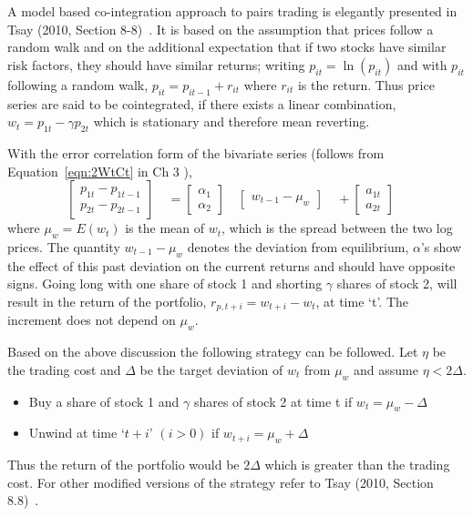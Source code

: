 A model based co-integration approach to pairs trading is elegantly presented in Tsay (2010, Section 8-8)~\cite{tsay}. It is based on the assumption that prices follow a random walk and on the additional expectation that if two stocks have similar risk factors, they should have similar returns; writing $p_{it} = \ln{(p_{it})}$ and with $p_{it}$ following a random walk, $p_{it} = p_{it-1} + r_{it}$ where $r_{it}$ is the return. Thus price series are said to be cointegrated, if there exists a linear combination, $w_t = p_{1t} - \gamma p_{2t}$ which is stationary and therefore mean reverting.


With the error correlation form of the bivariate series (follows from Equation~\ref{eqn:2WtCt} in Ch 3 ),
	\begin{equation}\label{eqn:errorbivar}
	\begin{bmatrix}
	p_{1t} - p_{1t-1} \\
	p_{2t} - p_{2t-1}
	\end{bmatrix}\quad
	= \begin{bmatrix} 
	\alpha_1\\ \alpha_2 
	\end{bmatrix}\quad 
	\begin{bmatrix} 
	w_{t-1} - \mu_{w}
	\end{bmatrix}\quad + 
	\begin{bmatrix} 
	a_{1t} \\ a_{2t} 
	\end{bmatrix}\quad
	\end{equation}
where $\mu_w = E(w_t)$ is the mean of $w_t$, which is the spread between the two log prices. The quantity $w_{t-1} - \mu_w$ denotes the deviation from equilibrium, $\alpha$'s show the effect of this past deviation on the current returns and should have opposite signs. Going long with one share of stock 1 and shorting $\gamma$ shares of stock 2, will result in the return of the portfolio, $r_{p,t+i} = w_{t+i} - w_t$, at time `t'. The increment does not depend on $\mu_w$.


Based on the above discussion the following strategy can be followed. Let $\eta$ be the trading cost and $\Delta$ be the target deviation of $w_t$ from $\mu_w$ and assume $\eta < 2\Delta$.
\begin{itemize}
\item Buy a share of stock 1 and $\gamma$ shares of stock 2 at time t if $w_t = \mu_w - \Delta$

\item Unwind at time `$t+i$' $(i>0)$ if $w_{t+i} = \mu_w + \Delta$
\end{itemize}
Thus the return of the portfolio would be $2\Delta$ which is greater than the trading cost. For other modified versions of the strategy refer to Tsay (2010, Section 8.8)~\cite{tsay}.

